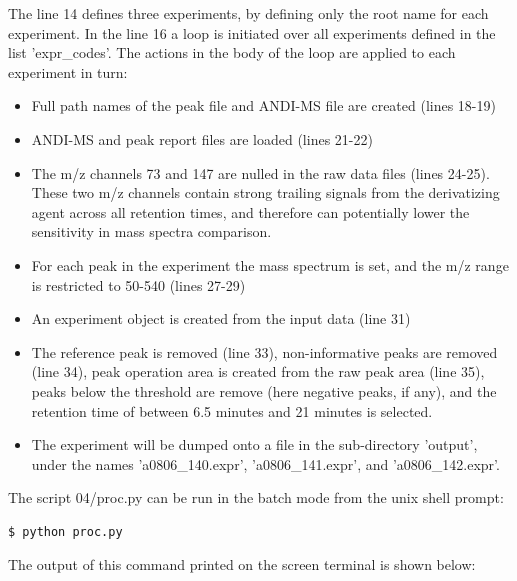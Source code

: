 \noindent
The line 14 defines three experiments, by defining only the root name for
each experiment. In the line 16 a loop is initiated over all experiments
defined in the list 'expr\_codes'.  The actions in the body of the loop
are applied to each experiment in turn:

\begin{itemize}
\item Full path names of the peak file and ANDI-MS file are created (lines 18-19)
\item ANDI-MS and peak report files are loaded (lines 21-22) 
\item The m/z channels 73 and 147 are nulled in the raw data files (lines
24-25). These two m/z channels contain strong trailing signals from the
derivatizing agent across all retention times, and therefore can potentially
lower the sensitivity in mass spectra comparison.
\item For each peak in the experiment the mass spectrum is set, and the
m/z range is restricted to 50-540 (lines 27-29)
\item An experiment object is created from the input data (line 31)
\item The reference peak is removed (line 33), non-informative peaks are
removed (line 34), peak operation area is created from the raw peak area
(line 35), peaks below the threshold are remove (here negative peaks, if
any), and the retention time of between 6.5 minutes and 21 minutes is
selected.
\item The experiment will be dumped onto a file in the sub-directory
'output', under the names 'a0806\_140.expr', 'a0806\_141.expr', and
'a0806\_142.expr'.
\end{itemize}

The script 04/proc.py can be run in the batch mode from the unix shell
prompt:

\begin{verbatim}
$ python proc.py
\end{verbatim}

\noindent
The output of this command printed on the screen terminal is shown below:

